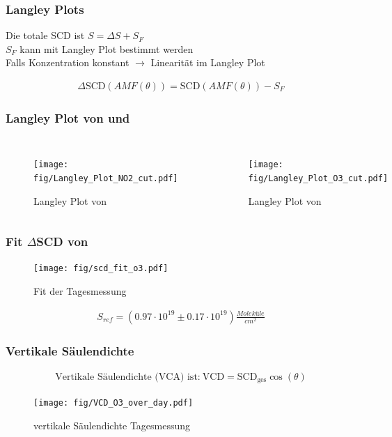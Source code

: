 \documentclass{beamer}
\begin{document}
\begin{frame}
    \frametitle{Langley Plots}
    Die totale SCD ist $S = \Delta S + S_F$\\
    $S_F$ kann mit Langley Plot bestimmt werden\\
    Falls Konzentration konstant $\to$ Linearität im Langley Plot
    
    \begin{align}
    	\Delta \text{SCD}(AMF(\theta)) = \text{SCD}(AMF(\theta)) - S_F
    \end{align}
\end{frame}

\begin{frame}
    \frametitle{Langley Plot von  und }
    \begin{columns}
    	\begin{figure}
    		\texttt{[image: fig/Langley\_Plot\_NO2\_cut.pdf]}
            \caption{Langley Plot von }   
	 	\end{figure}
 	    \begin{figure}
 	    	\texttt{[image: fig/Langley\_Plot\_O3\_cut.pdf]}
 	        \caption{Langley Plot von }
     	\end{figure} 
    \end{columns} 	
\end{frame}

\begin{frame}
    \frametitle{Fit $\Delta$SCD von }
    \vspace{-0.2cm}
    \begin{figure}
    	\texttt{[image: fig/scd\_fit\_o3.pdf]}
    	\caption{Fit der Tagesmessung }
    \end{figure}
	\vspace{-0.5cm}
	\begin{align}
		S_{ref}= (0.97 \cdot 10^{19}\pm 0.17 \cdot 10^{19}) \si{\frac{Moleküle}{cm^2}}
	\end{align}
\end{frame}

\begin{frame}
    \frametitle{Vertikale Säulendichte }
    \begin{align}
    	\text{Vertikale Säulendichte (VCA) ist:}\	\text{VCD} = \text{SCD}_\text{ges} \cos (\theta)
    \end{align}
    
    \vspace{-0.5cm}
    
    \begin{figure}
    	\texttt{[image: fig/VCD\_O3\_over\_day.pdf]}
		\caption{vertikale Säulendichte Tagesmessung }    
	\end{figure}
\end{frame}
\end{document}
